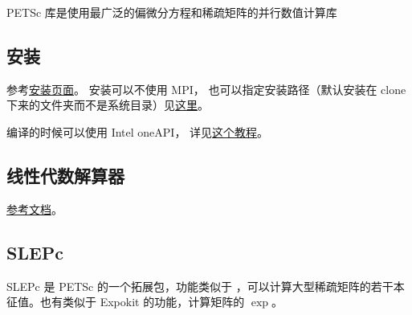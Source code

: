 
\begin{issues}
\issueDraft
\end{issues}

PETSc 库是使用最广泛的偏微分方程和稀疏矩阵的并行数值计算库

\subsection{安装}
参考\href{https://petsc.org/release/install/install_tutorial/}{安装页面}。
安装可以不使用 MPI， 也可以指定安装路径（默认安装在 clone 下来的文件夹而不是系统目录）见\href{https://petsc.org/release/install/install/#mpi-problems-i-don-t-want-mpi}{这里}。

编译的时候可以使用 Intel oneAPI， 详见\href{https://www.intel.com/content/www/us/en/developer/articles/technical/mkl-blas-lapack-with-petsc.html}{这个教程}。

\subsection{线性代数解算器}
\href{https://petsc.org/release/docs/manual/ksp/}{参考文档}。

\subsection{SLEPc}
SLEPc 是 PETSc 的一个拓展包，功能类似于 ，可以计算大型稀疏矩阵的若干本征值。也有类似于 Expokit 的功能，计算矩阵的 $\exp$。
